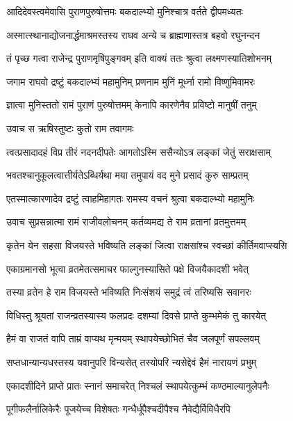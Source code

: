 \twolineshloka
{आदिदेवस्त्वमेवासि पुराणपुरुषोत्तमः}
{बकदाल्भ्यो मुनिश्चात्र वर्तते द्वीपमध्यतः}%

\twolineshloka
{अस्मात्स्थानाद्योजनार्द्धमाश्रमस्तस्य राघव}
{अन्ये च ब्राह्मणास्तत्र बहवो रघुनन्दन}%

\twolineshloka
{तं पृच्छ गत्वा राजेन्द्र पुराणमृषिपुङ्गवम्}
{इति वाक्यं ततः श्रुत्वा लक्ष्मणस्यातिशोभनम्}%

\twolineshloka
{जगाम राघवो द्रष्टुं बकदाल्भ्यं महामुनिम्}
{प्रणनाम मुनिं मूर्ध्ना रामो विष्णुमिवामरः}%

\twolineshloka
{ज्ञात्वा मुनिस्ततो रामं पुराणं पुरुषोत्तमम्}
{केनापि कारणेनैव प्रविष्टो मानुषीं तनुम्}%

\onelineshloka
{उवाच स ऋषिस्तुष्टः कुतो राम तवागमः}%


\twolineshloka
{त्वत्प्रसादादहं विप्र तीरं नदनदीपतेः}
{आगतोऽस्मि ससैन्योऽत्र लङ्कां जेतुं सराक्षसाम्}%

\twolineshloka
{भवतश्चानुकूलत्वात्तीर्यतेऽब्धिर्यथा मया}
{तमुपायं वद मुने प्रसादं कुरु साम्प्रतम्}%

\twolineshloka
{एतस्मात्कारणादेव द्रष्टुं त्वाहमिहागतः}
{रामस्य वचनं श्रुत्वा बकदाल्भ्यो महामुनिः}%

\twolineshloka
{उवाच सुप्रसन्नात्मा रामं राजीवलोचनम्}
{कर्तव्यमद्य ते राम व्रतानां व्रतमुत्तमम्}%

\twolineshloka
{कृतेन येन सहसा विजयस्ते भविष्यति}
{लङ्कां जित्वा राक्षसांश्च स्वच्छां कीर्तिमवाप्स्यसि}%

\twolineshloka
{एकाग्रमानसो भूत्वा व्रतमेतत्समाचर}
{फाल्गुनस्यासिते पक्षे विजयैकादशी भवेत्}%

\twolineshloka
{तस्या व्रतेन हे राम विजयस्ते भविष्यति}
{निःसंशयं समुद्रं त्वं तरिष्यसि सवानरः}%

\twolineshloka
{विधिस्तु श्रूयतां राजन्व्रतस्यास्य फलप्रदः}
{दशम्यां दिवसे प्राप्ते कुम्भमेकं तु कारयेत्}%

\twolineshloka
{हैमं वा राजतं वापि ताम्रं वाप्यथ मृन्मयम्}
{स्थापयेच्छोभितं चैव जलपूर्णं सपल्लवम्}%

\twolineshloka
{सप्तधान्यान्यधस्तस्य यवानुपरि विन्यसेत्}
{तस्योपरि न्यसेद्देवं हैमं नारायणं प्रभुम्}%

\twolineshloka
{एकादशीदिने प्राप्ते प्रातः स्नानं समाचरेत्}
{निश्चलं स्थापयेत्कुम्भं कण्ठमाल्यानुलेपनैः}%

\twolineshloka
{पूगीफलैर्नालिकेरैः पूजयेच्च विशेषतः}
{गन्धैर्धूपैश्चदीपैश्च नैवेद्यैर्विविधैरपि}%

